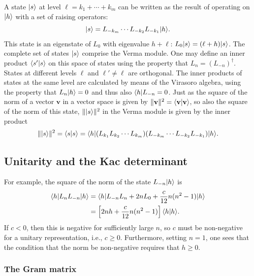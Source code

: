 A state $\lvert s\rangle$ at level $\ell = k_1+\cdots+k_m$ can be written as the result of operating on $\lvert h\rangle$ with a set
of raising operators:
\begin{equation}
  \lvert s\rangle = L_{-k_m}\cdots L_{-k_2}L_{-k_1}\lvert h\rangle .
\end{equation}
This state is an eigenstate of $L_0$ with eigenvalue $h+\ell$: $L_0\lvert s\rangle = (\ell+h)\lvert s\rangle$. The complete set of
states $\lvert s\rangle$ comprise the Verma module. One may define an inner product $\langle s'\vert s\rangle$ on this space of states
using the property that $L_n = (L_{-n})^\dagger$. States at different levels $\ell$ and $\ell'\ne\ell$ are orthogonal.
The inner products of states at the same level are calculated by means of the Virasoro algebra, using the property
that $L_n\lvert h\rangle = 0$ and thus also $\langle h\rvert L_{-n} = 0$. Just as the square of the norm of a vector $\mathbf v$ in a
vector space is given by $\lVert\mathbf v\rVert^2 = \langle \mathbf v\vert \mathbf v\rangle$, so also the square of the norm of
this state, $\lVert\lvert s\rangle\rVert^2$ in the Verma module is given by the inner product
\begin{equation}
  \lVert\lvert s\rangle\rVert^2 = \langle s\vert s\rangle
  = \langle h\rvert(L_{k_1}L_{k_2}\cdots L_{k_m})(L_{-k_m}\cdots L_{-k_2}L_{-k_1})\lvert h\rangle .
\end{equation}

\subsection{Unitarity and the Kac determinant}

For example, the square of the norm of the state $L_{-n}\lvert h\rangle$ is
\begin{align}
  \langle h\rvert L_nL_{-n}\lvert h\rangle &= \langle h\rvert L_{-n}L_n + 2nL_0 + \frac{c}{12}n(n^2-1)\lvert h\rangle \nonumber\\
  &= \left[2nh + \frac{c}{12}n(n^2-1)\right]\langle h\vert h\rangle .
\end{align}
If $c<0$, then this is negative for sufficiently large $n$, so $c$ must be non-negative for a unitary representation,
i.e., $c\ge0$. Furthermore, setting $n = 1$, one sees that the condition that the norm be non-negative requires that
$h\ge0$.

\subsubsection*{The Gram matrix}

